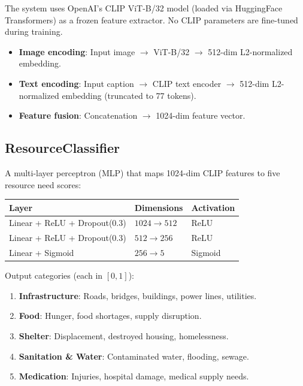 \documentclass[11pt,a4paper]{article}
\begin{document}
The system uses OpenAI's CLIP ViT-B/32 model (loaded via HuggingFace Transformers) as a frozen feature extractor. No CLIP parameters are fine-tuned during training.

\begin{itemize}
    \item \textbf{Image encoding}: Input image $\rightarrow$ ViT-B/32 $\rightarrow$ 512-dim L2-normalized embedding.
    \item \textbf{Text encoding}: Input caption $\rightarrow$ CLIP text encoder $\rightarrow$ 512-dim L2-normalized embedding (truncated to 77 tokens).
    \item \textbf{Feature fusion}: Concatenation $\rightarrow$ 1024-dim feature vector.
\end{itemize}

\subsection{ResourceClassifier}

A multi-layer perceptron (MLP) that maps 1024-dim CLIP features to five resource need scores:

\begin{table}[H]
\centering
\begin{tabular}{lll}
\toprule
\textbf{Layer} & \textbf{Dimensions} & \textbf{Activation} \\
\midrule
Linear + ReLU + Dropout(0.3) & $1024 \rightarrow 512$ & ReLU \\
Linear + ReLU + Dropout(0.3) & $512 \rightarrow 256$ & ReLU \\
Linear + Sigmoid & $256 \rightarrow 5$ & Sigmoid \\
\bottomrule
\end{tabular}
\end{table}

Output categories (each in $[0, 1]$):
\begin{enumerate}
    \item \textbf{Infrastructure}: Roads, bridges, buildings, power lines, utilities.
    \item \textbf{Food}: Hunger, food shortages, supply disruption.
    \item \textbf{Shelter}: Displacement, destroyed housing, homelessness.
    \item \textbf{Sanitation \& Water}: Contaminated water, flooding, sewage.
    \item \textbf{Medication}: Injuries, hospital damage, medical supply needs.
\end{enumerate}
\end{document}
